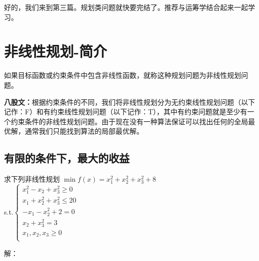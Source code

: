 \documentclass[a4paper,20pt]{article}
\title{}
\author{}
\date{}
\begin{document}
\renewcommand{\lstlistlistingname}{代码汇总}
\renewcommand{\lstlistingname}{代码}
\renewcommand\tablename{表}
好的，我们来到第三篇。规划类问题就快要完结了。推荐与运筹学结合起来一起学习。
\section{非线性规划-简介}
如果目标函数或约束条件中包含非线性函数，就称这种规划问题为非线性规划问
题。
\par \textbf{八股文：}根据约束条件的不同，我们将非线性规划分为无约束线性规划问题（以下记作：F）和有约束线性规划问题（以下记作：T），其中有约束问题就是至少有一个约束条件的非线性规划问题。由于现在没有一种算法保证可以找出任何的全局最优解，通常我们只能找到算法的局部最优解。
\subsection{有限的条件下，最大的收益}
求下列非线性规划
$\min f(x) = x_1^2+x_2^2+x_3^2+8$
\\s.t.$\left\{\begin{matrix}
        x_1^2-x_2+x_3^2 \geqslant 0  \\
        x_1+x_2^2+x_3^2 \leqslant 20 \\
        -x_1-x_2^2+2=0               \\
        x_2+x_3^2=3                  \\
        x_1,x_2,x_3\geqslant 0       \\
    \end{matrix}\right.$
\par \small{解：} \\
\end{document}
